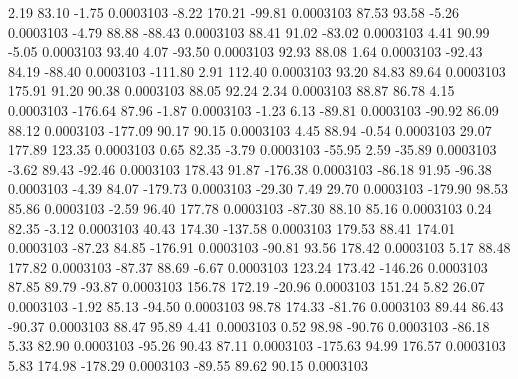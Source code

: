         2.19       83.10       -1.75     0.0003103
       -8.22      170.21      -99.81     0.0003103
       87.53       93.58       -5.26     0.0003103
       -4.79       88.88      -88.43     0.0003103
       88.41       91.02      -83.02     0.0003103
        4.41       90.99       -5.05     0.0003103
       93.40        4.07      -93.50     0.0003103
       92.93       88.08        1.64     0.0003103
      -92.43       84.19      -88.40     0.0003103
     -111.80        2.91      112.40     0.0003103
       93.20       84.83       89.64     0.0003103
      175.91       91.20       90.38     0.0003103
       88.05       92.24        2.34     0.0003103
       88.87       86.78        4.15     0.0003103
     -176.64       87.96       -1.87     0.0003103
       -1.23        6.13      -89.81     0.0003103
      -90.92       86.09       88.12     0.0003103
     -177.09       90.17       90.15     0.0003103
        4.45       88.94       -0.54     0.0003103
       29.07      177.89      123.35     0.0003103
        0.65       82.35       -3.79     0.0003103
      -55.95        2.59      -35.89     0.0003103
       -3.62       89.43      -92.46     0.0003103
      178.43       91.87     -176.38     0.0003103
      -86.18       91.95      -96.38     0.0003103
       -4.39       84.07     -179.73     0.0003103
      -29.30        7.49       29.70     0.0003103
     -179.90       98.53       85.86     0.0003103
       -2.59       96.40      177.78     0.0003103
      -87.30       88.10       85.16     0.0003103
        0.24       82.35       -3.12     0.0003103
       40.43      174.30     -137.58     0.0003103
      179.53       88.41      174.01     0.0003103
      -87.23       84.85     -176.91     0.0003103
      -90.81       93.56      178.42     0.0003103
        5.17       88.48      177.82     0.0003103
      -87.37       88.69       -6.67     0.0003103
      123.24      173.42     -146.26     0.0003103
       87.85       89.79      -93.87     0.0003103
      156.78      172.19      -20.96     0.0003103
      151.24        5.82       26.07     0.0003103
       -1.92       85.13      -94.50     0.0003103
       98.78      174.33      -81.76     0.0003103
       89.44       86.43      -90.37     0.0003103
       88.47       95.89        4.41     0.0003103
        0.52       98.98      -90.76     0.0003103
      -86.18        5.33       82.90     0.0003103
      -95.26       90.43       87.11     0.0003103
     -175.63       94.99      176.57     0.0003103
        5.83      174.98     -178.29     0.0003103
      -89.55       89.62       90.15     0.0003103
